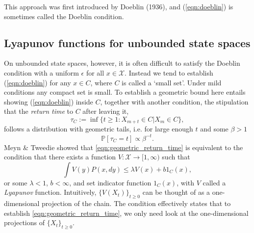 \documentclass{article}
\newcommand{\ch}[1]{ \{#1_t\}_{t \geq 0} }
\newcommand{\X}{\mathcal{X}}
\begin{document}
\vspace{0.3cm}

This approach was first introduced by Doeblin (1936), and (\ref{eqn:doeblin}) is sometimes called the Doeblin condition.

\subsection{Lyapunov functions for unbounded state spaces}
On unbounded state spaces, however, it is often difficult to satisfy the Doeblin condition with a uniform $\epsilon$ for all $x \in \X$.  Instead we tend to establish (\ref{eqn:doeblin}) for any $x \in C$, where $C$ is called a `small set'.  Under mild conditions any compact set is small.  To establish a geometric bound here entails showing (\ref{eqn:doeblin}) inside $C$, together with another condition, the stipulation that the \emph{return time} to $C$ after leaving it,
\begin{equation} \label{eqn:return}
\tau_C := \inf \{ t \geq 1 : X_{m+t} \in C | X_m \in C \},
\end{equation}
follows a distribution with geometric tails, i.e. for large enough $t$ and some $\beta > 1$
\begin{equation}
\mathbb{P}[\tau_C = t] \propto \beta^{-t}. \label{eqn:geometric_return_time}
\end{equation}
Meyn \& Tweedie showed that \eqref{eqn:geometric_return_time} is equivalent to the condition that there exists a function $V: \X \to [1,\infty)$ such that
\begin{equation}
\int V(y)P(x,dy) \leq \lambda V(x) + b1_C(x), \label{eqn:lyapunov_condition}
\end{equation}
or some $\lambda<1$, $b < \infty$, and set indicator function $1_C(x)$, with $V$ called a \emph{Lyapunov} function.  Intuitively, $\{ V(X_t) \}_{t \geq 0}$ can be thought of as a one-dimensional projection of the chain.  The condition effectively states that to establish \eqref{eqn:geometric_return_time}, we only need look at the one-dimensional projections of $\ch{X}$.
\end{document}
